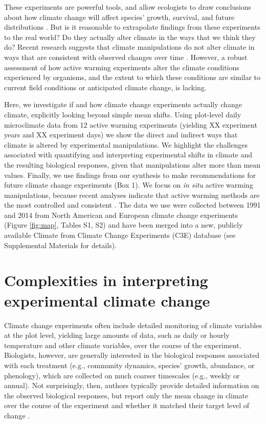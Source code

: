 \documentclass{article}
\begin{document}
\par These experiments are powerful tools, and allow ecologists to draw conclusions about how climate change will affect species' growth, survival, and future distributions \citep{dukes1999,hobbie1999,reich2015,gruner2016}. But is it reasonable to extrapolate findings from these experiments to the real world? Do they actually alter climate in the ways that we think they do? Recent research suggests that climate manipulations do not alter climate in ways that are consistent with observed changes over time \citep{wolkovich2012}. However, a robust assessment of how active warming experiments alter the climate conditions experienced by organisms, and the extent to which these conditions are similar to current field conditions or anticipated climate change, is lacking. 

\par Here, we investigate if and how climate change experiments actually change climate, explicitly looking beyond simple mean shifts. Using plot-level daily microclimate data from 12 active warming experiments (yielding XX experiment years and XX experiment days) we show the direct and indirect ways that climate is altered by experimental manipulations. We highlight the challenges associated with quantifying and interpreting experimental shifts in climate and the resulting biological responses, given that manipulations alter more than mean values. Finally, we use findings from our synthesis to make recommendations for future climate change experiments (Box 1). We focus on \textit{in situ} active warming manipulations, because recent analyses indicate that active warming methods are the most controlled and consistent \citep{kimball2005,kimball2008,aronson2009,wolkovich2012}. The data we use were collected between 1991 and 2014 from North American and European climate change experiments (Figure \ref{fig:map}, Tables S1, S2) and have been merged into a new, publicly available Climate from Climate Change Experiments (C3E) database (see Supplemental Materials for details). 

\section* {Complexities in interpreting experimental climate change} 

Climate change experiments often include detailed monitoring of climate variables at the plot level, yielding large amounts of data, such as daily or hourly temperature and other climate variables, over the course of the experiment. Biologists, however, are generally interested in the biological responses associated with each treatment (e.g., community dynamics, species' growth, abundance, or phenology), which are collected on much coarser timescales (e.g., weekly or annual). Not surprisingly, then, authors typically provide detailed information on the observed biological responses, but report only the mean change in climate over the course of the experiment and whether it matched their target level of change \citep[e.g.][]{price1998,clark2014a,clark2014b,rollinson2012}. 
\end{document}
